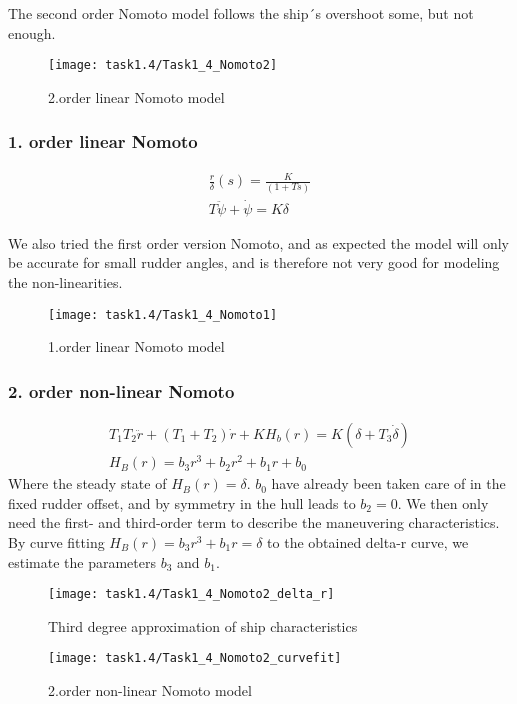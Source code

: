The second order Nomoto model follows the ship´s overshoot some, but not enough.

\begin{figure}[h]
    \centering
    \texttt{[image: task1.4/Task1\_4\_Nomoto2]}
    \caption{2.order linear Nomoto model}
    \label{fig:nomoto2_lin}
\end{figure}

\newpage
\subsubsection*{1. order linear Nomoto}

\begin{equation}
\begin{split}
	\frac{r}{\delta}(s) = \frac{K}{(1+Ts) } \\
	T\ddot{\psi} + \dot{\psi} = K\delta
\end{split}
\end{equation}

We also tried the first order version Nomoto, and as expected the model will only be accurate for small rudder angles, and is therefore not very good for modeling the non-linearities.

\begin{figure}[h]
    \centering
    \texttt{[image: task1.4/Task1\_4\_Nomoto1]}
    \caption{1.order linear Nomoto model}
    \label{fig:nomoto1_lin}
\end{figure}

\newpage
\subsubsection*{2. order non-linear Nomoto}
\begin{equation}
\begin{split}
	T_1 T_2 \ddot{r} + (T_1 + T_2)\dot{r} + KH_b(r) = K(\delta + T_3\dot{\delta}) \\
	H_B(r) = b_3r^3 + b_2r^2 + b_1r + b_0
\end{split}
\end{equation}
Where the steady state of $H_B(r)=\delta$. $b_0$ have already been taken care of in the fixed rudder offset, and by symmetry in the hull leads to $b_2 = 0$. We then only need the first- and third-order term to describe the maneuvering characteristics. By curve fitting $H_B(r)=b_3r^3 + b_1r=\delta$ to the obtained delta-r curve, we estimate the parameters $b_3$ and $b_1$.
\begin{figure}[h]
    \centering
    \begin{minipage}{0.4\textwidth}
    \centering
    \texttt{[image: task1.4/Task1\_4\_Nomoto2\_delta\_r]}
    \caption{Third degree approximation of ship characteristics}
    \label{fig:nomoto2_delta_r}
    \end{minipage}
    \vfill
    \begin{minipage}{0.4\textwidth}
    \centering
    \texttt{[image: task1.4/Task1\_4\_Nomoto2\_curvefit]}
    \caption{2.order non-linear Nomoto model}
    \label{fig:nomoto2_nonlin}
    \end{minipage}
\end{figure}


